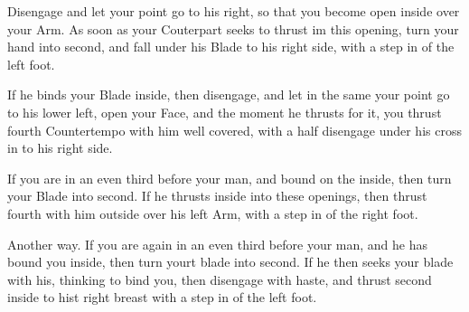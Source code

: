 \newpage


\newpage



Disengage and let your point go to his right, so that you become open
inside over your Arm. As soon as your Couterpart seeks to thrust im
this opening, turn your hand into second, and fall under his Blade to
his right side, with a step in of the left foot.

\exercise{}

If he binds your Blade inside, then disengage, and let in the same
your point go to his lower left, open your Face, and the moment he
thrusts for it, you thrust fourth Countertempo with him well covered,
with a half disengage under his cross in to his right side.

\exercise{}

If you are in an even third before your man, and bound on the
inside, then turn your Blade into second. If he thrusts inside into
these openings, then thrust fourth with him outside over his left Arm,
with a step in of the right foot.

\exercise{}

Another way. If you are again in an even third before your man, and he
has bound you inside, then turn yourt blade into second. If he then
seeks your blade with his, thinking to bind you, then disengage with
haste, and thrust second inside to hist right breast with a step in of
the left foot.

